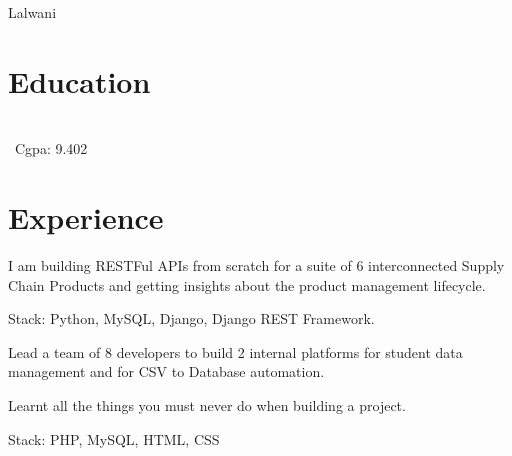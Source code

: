 \documentclass[]{deedy-resume-openfont}
\begin{document}
      
  
 {Lalwani}\\\vspace{4pt}\underlineheader{}

%
%
\section{Education}
\raggedright

    \hspace*{\fill}  \\
    \hspace*{\fill}\
    Cgpa: 9.402\\
    \sectionsep
        \section{Experience}
        \hfill {}
            \begin{tightemize}
  \item I am building RESTFul APIs from scratch for a suite of 6 interconnected Supply Chain Products and getting insights about the product management lifecycle.
  \item Stack: Python, MySQL, Django, Django REST Framework.
\end{tightemize}
            \sectionsep
        \hfill {}
            \begin{tightemize}
  \item Lead a team of 8 developers to build 2 internal platforms for student data management and for CSV to Database automation.
  \item Learnt all the things you must never do when building a project.
  \item Stack: PHP, MySQL, HTML, CSS
\end{tightemize}
            \sectionsep
%
%
\end{document}
